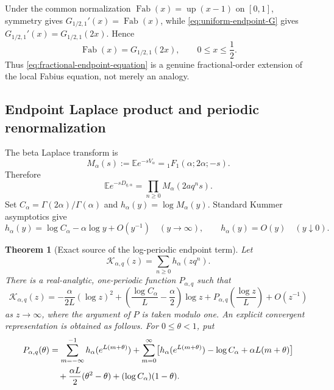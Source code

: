 \documentclass[11pt]{article}
\newtheorem{theorem}{Theorem}[section]
\theoremstyle{definition}
\theoremstyle{remark}
\newcommand{\E}{\mathbb{E}}
\newcommand{\Fab}{\operatorname{Fab}}
\newcommand{\upf}{\operatorname{up}}
\newcommand{\Kcal}{\mathcal{K}}
\begin{document}
Under the common normalization
\(\Fab(x)=\upf(x-1)\) on \([0,1]\), symmetry gives
\(G_{1/2,1}'(x)=\Fab(x)\), while \eqref{eq:uniform-endpoint-G} gives
\(G_{1/2,1}'(x)=G_{1/2,1}(2x)\).  Hence
\begin{equation}
 \Fab(x)=G_{1/2,1}(2x),\qquad 0\le x\le\frac12.
 \label{eq:Fabius-G-relation}
\end{equation}
Thus \eqref{eq:fractional-endpoint-equation} is a genuine fractional-order
extension of the local Fabius equation, not merely an analogy.

\subsection{Endpoint Laplace product and periodic renormalization}

The beta Laplace transform is
\begin{equation}
 M_\alpha(s):=\E e^{-sV_\alpha}
 ={}_1F_1(\alpha;2\alpha;-s).
 \label{eq:beta-laplace}
\end{equation}
Therefore
\begin{equation}
 \E e^{-sD_{q,\alpha}}
 =\prod_{n\ge0}M_\alpha(2aq^ns).
 \label{eq:endpoint-laplace-product}
\end{equation}
Set \(C_\alpha=\Gamma(2\alpha)/\Gamma(\alpha)\) and
\(h_\alpha(y)=\log M_\alpha(y)\).  Standard Kummer asymptotics \cite{DLMF} give
\begin{equation}
 h_\alpha(y)=\log C_\alpha-\alpha\log y+O(y^{-1})
 \quad(y\to\infty),
 \qquad
 h_\alpha(y)=O(y)\quad(y\downarrow0).
 \label{eq:h-asymptotics}
\end{equation}

\begin{theorem}[Exact source of the log-periodic endpoint term]
\label{thm:laplace-periodicity}
Let
\[
 \Kcal_{\alpha,q}(z)=\sum_{n\ge0}h_\alpha(zq^n).
\]
There is a real-analytic, one-periodic function \(P_{\alpha,q}\) such that
\begin{equation}
 \Kcal_{\alpha,q}(z)
 =-\frac{\alpha}{2L}(\log z)^2
 +\left(\frac{\log C_\alpha}{L}-\frac\alpha2\right)\log z
 +P_{\alpha,q}\left(\frac{\log z}{L}\right)
 +O(z^{-1})
 \label{eq:laplace-periodic-asymptotic}
\end{equation}
as \(z\to\infty\), where the argument of \(P\) is taken modulo one.
An explicit convergent representation is obtained as follows.  For
\(0\le\theta<1\), put
\begin{align}
 P_{\alpha,q}(\theta)
 &=\sum_{m=-\infty}^{-1}h_\alpha(e^{L(m+\theta)})
 +\sum_{m=0}^{\infty}
 \bigl[h_\alpha(e^{L(m+\theta)})-\log C_\alpha
      +\alpha L(m+\theta)\bigr]
 \notag\\
 &\quad+\frac{\alpha L}{2}(\theta^2-\theta)
 +(\log C_\alpha)(1-\theta).
 \label{eq:periodic-profile-series}
\end{align}
\end{theorem}
\end{document}
